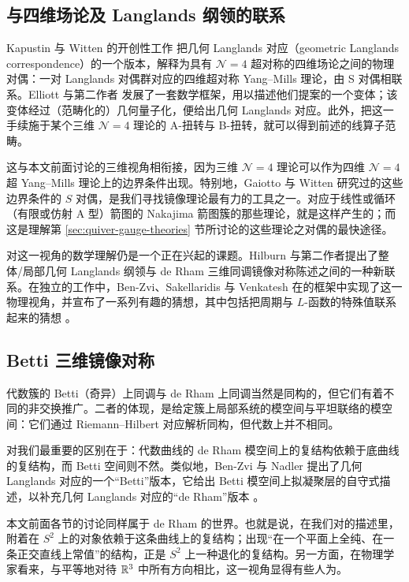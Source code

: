 \subsection{与四维场论及 Langlands 纲领的联系}

Kapustin 与 Witten 的开创性工作 \cite{kapustinElectricmagneticDuality2007} 把几何 Langlands 对应（geometric Langlands correspondence）的一个版本，解释为具有 $\mathcal{N}=4$ 超对称的四维场论之间的物理对偶：一对 Langlands 对偶群对应的四维超对称 Yang–Mills 理论，由 S 对偶相联系。Elliott 与第二作者 \cite{elliottGeometricLanglands2018} 发展了一套数学框架，用以描述他们提案的一个变体；该变体经过（范畴化的）几何量子化，便给出几何 Langlands 对应。此外，把这一手续施于某个三维 $\mathcal{N}=4$ 理论的 A-扭转与 B-扭转，就可以得到前述的线算子范畴。

这与本文前面讨论的三维视角相衔接，因为三维 $\mathcal{N}=4$ 理论可以作为四维 $\mathcal{N}=4$ 超 Yang–Mills 理论上的边界条件出现。特别地，Gaiotto 与 Witten \cite{gaiottoSDuality2009} 研究过的这些边界条件的 $S$ 对偶，是我们寻找镜像理论最有力的工具之一。对应于线性或循环（有限或仿射 A 型）箭图的 Nakajima 箭图簇的那些理论，就是这样产生的；而这是理解第 \ref{sec:quiver-gauge-theories} 节所讨论的这些理论之对偶的最快途径。

对这一视角的数学理解仍是一个正在兴起的课题。Hilburn 与第二作者提出了整体/局部几何 Langlands 纲领与 de Rham 三维同调镜像对称陈述之间的一种新联系。在独立的工作中，Ben-Zvi、Sakellaridis 与 Venkatesh 在的框架中实现了这一物理视角，并宣布了一系列有趣的猜想，其中包括把周期与 $L$-函数的特殊值联系起来的猜想 \cite{ben-zviRelativeLanglands}。

\subsection{Betti 三维镜像对称}

代数簇的 Betti（奇异）上同调与 de Rham 上同调当然是同构的，但它们有着不同的非交换推广。二者的体现，是给定簇上局部系统的模空间与平坦联络的模空间：它们通过 Riemann–Hilbert 对应解析同构，但代数上并不相同。

对我们最重要的区别在于：代数曲线的 de Rham 模空间上的复结构依赖于底曲线的复结构，而 Betti 空间则不然。类似地，Ben-Zvi 与 Nadler 提出了几何 Langlands 对应的一个“Betti”版本，它给出 Betti 模空间上拟凝聚层的自守式描述，以补充几何 Langlands 对应的“de Rham”版本 \cite{ben-zviBettiGeometric2018}。

本文前面各节的讨论同样属于 de Rham 的世界。也就是说，在我们对的描述里，附着在 $S^2$ 上的对象依赖于这条曲线上的复结构；出现“在一个平面上全纯、在一条正交直线上常值”的结构，正是 $S^2$ 上一种退化的复结构。另一方面，在物理学家看来，与平等地对待 $\mathbb{R}^3$ 中所有方向相比，这一视角显得有些人为。

